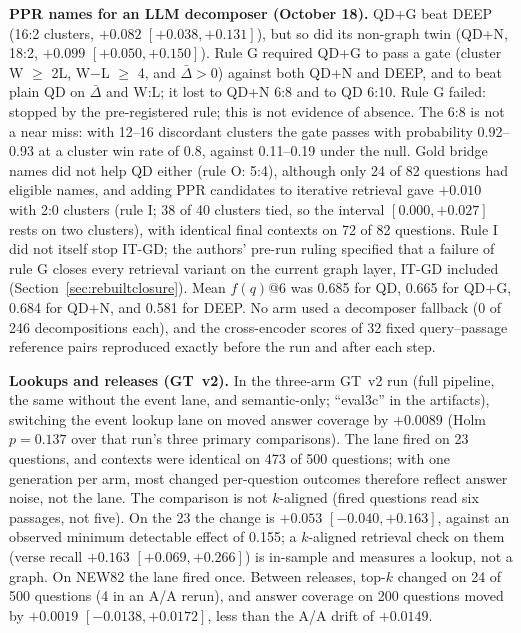 \textbf{PPR names for an LLM decomposer (October 18).} QD+G beat DEEP
(16:2 clusters, $+0.082$ $[+0.038, +0.131]$), but so did its non-graph twin
(QD+N, 18:2, $+0.099$ $[+0.050, +0.150]$). Rule G required QD+G to pass a
gate (cluster W $\ge$ 2L, W$-$L $\ge$ 4, and $\bar{\Delta}>0$) against both QD+N and DEEP, and
to beat plain QD on $\bar{\Delta}$ and W:L; it lost to QD+N 6:8 and to QD 6:10. Rule G failed:
stopped by the pre-registered rule; this is not evidence of absence. The
6:8 is not a near miss: with 12--16 discordant clusters the gate passes
with probability 0.92--0.93 at a cluster win rate of 0.8, against
0.11--0.19 under the null. Gold bridge names did not help QD either (rule
O: 5:4), although only 24 of 82 questions had eligible names, and adding
PPR candidates to iterative retrieval gave $+0.010$ with 2:0 clusters
(rule I; 38 of 40 clusters tied, so the interval $[0.000, +0.027]$ rests
on two clusters), with identical final contexts on 72 of 82 questions.
Rule I did not itself stop IT-GD; the authors' pre-run ruling specified
that a failure of rule G closes every retrieval variant on the current
graph layer, IT-GD included (Section~\ref{sec:rebuiltclosure}). Mean
$f(q)$@6 was 0.685
for QD, 0.665 for QD+G, 0.684 for QD+N, and 0.581 for DEEP. No arm used
a decomposer fallback (0 of 246 decompositions each), and the
cross-encoder scores of 32 fixed query--passage reference pairs
reproduced exactly before the run and after each step.

\textbf{Lookups and releases (GT~v2).} In the three-arm GT~v2 run
(full pipeline, the same without the event lane, and semantic-only;
``eval3c'' in the artifacts), switching the event lookup lane on moved
answer coverage by $+0.0089$ (Holm $p=0.137$ over that run's three
primary comparisons). The lane fired on 23 questions, and contexts were
identical on 473 of 500 questions; with one generation per
arm, most changed per-question outcomes therefore reflect answer noise,
not the lane. The comparison is not $k$-aligned (fired questions read six
passages, not five). On the 23 the change is $+0.053$
$[-0.040, +0.163]$, against an observed minimum detectable effect of 0.155;
a $k$-aligned retrieval check on them (verse recall $+0.163$
$[+0.069, +0.266]$) is in-sample and measures a lookup, not a graph. On
NEW82 the lane fired once. Between releases, top-$k$ changed on 24 of 500
questions (4 in an A/A rerun), and answer coverage on 200 questions moved
by $+0.0019$ $[-0.0138, +0.0172]$, less than the A/A drift of $+0.0149$.

